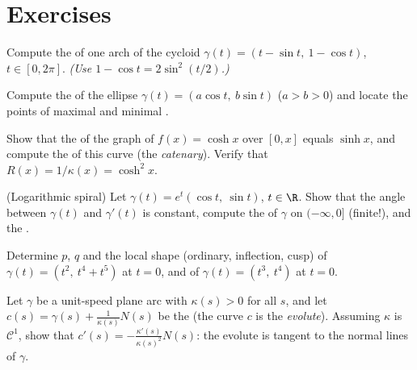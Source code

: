 \section{Exercises}

\begin{exercise}[$\star$]\label{exo:b2:curves:1}
Compute the  of one arch of the cycloid $\gamma(t) = (t -
\sin t,\ 1 - \cos t)$, $t \in [0, 2\pi]$. \emph{(Use $1 - \cos t =
2\sin^2(t/2)$.)}
\end{exercise}

\begin{exercise}[$\star$]\label{exo:b2:curves:2}
Compute the  of the ellipse $\gamma(t) = (a\cos t,\ b\sin
t)$ ($a > b > 0$) and locate the points of maximal and minimal
.
\end{exercise}

\begin{exercise}[$\star$]\label{exo:b2:curves:3}
Show that the  of the graph of $f(x) = \cosh x$ over
$[0, x]$ equals $\sinh x$, and compute the  of this
curve (the \emph{catenary}). Verify that $R(x) = 1/\kappa(x) =
\cosh^2 x$.
\end{exercise}

\begin{exercise}[$\star\star$]\label{exo:b2:curves:4}
(Logarithmic spiral) Let $\gamma(t) = e^{t}(\cos t,\ \sin t)$, $t
\in \R$.
Show that the angle between $\gamma(t)$ and $\gamma'(t)$ is
constant, compute the  of $\gamma$ on $(-\infty, 0]$
(finite!), and the .
\end{exercise}

\begin{exercise}[$\star\star$]\label{exo:b2:curves:5}
Determine $p$, $q$ and the local shape (ordinary, inflection,
cusp) of $\gamma(t) = (t^2,\ t^4 + t^5)$ at $t = 0$, and of
$\gamma(t) = (t^3,\ t^4)$ at $t = 0$.
\end{exercise}

\begin{exercise}[$\star\star$]\label{exo:b2:curves:6}
Let $\gamma$ be a unit-speed plane arc with $\kappa(s) > 0$ for
all $s$, and let $c(s) = \gamma(s) + \frac{1}{\kappa(s)}N(s)$ be
the  (the curve $c$ is the \emph{evolute}).
Assuming $\kappa$ is $\mathcal{C}^1$, show that $c'(s) =
-\frac{\kappa'(s)}{\kappa(s)^2}N(s)$: the evolute is tangent to
the normal lines of $\gamma$.
\end{exercise}

